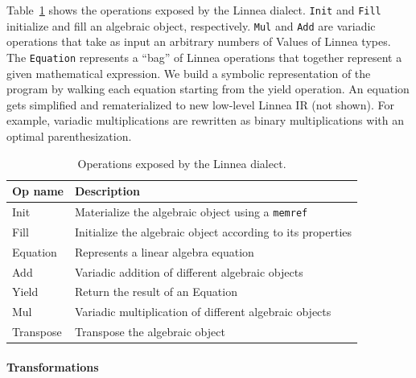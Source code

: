 \documentclass[conference]{IEEEtran}
\begin{document}
Table~\ref{table:operations} shows the operations exposed by the Linnea
dialect. \texttt{Init} and \texttt{Fill} initialize and
fill an algebraic object, respectively. \texttt{Mul} and \texttt{Add} are
variadic operations that take as input an arbitrary numbers of Values of
Linnea types.  The \texttt{Equation} represents a ``bag'' of Linnea operations
that together represent a given mathematical expression. We build a symbolic
representation of the program by walking each equation starting from the yield
operation. An equation gets simplified and rematerialized to new low-level
Linnea IR (not shown).  For example, variadic multiplications are  rewritten as binary
multiplications with an optimal parenthesization. 

\begin{table}
\begin{center}
\begin{tabular}{ll}
    \toprule
    \footnotesize{Op name}     & \footnotesize{Description} \\ \midrule
    \footnotesize{Init} & \footnotesize{Materialize the algebraic object using a \texttt{memref}} \\
    \rowcolor{aluminium1}
    \footnotesize{Fill} & \footnotesize{Initialize the algebraic object according to its properties}  \\
    \footnotesize{Equation} & \footnotesize{Represents a linear algebra equation} \\
    \rowcolor{aluminium1}
    \footnotesize{Add} & \footnotesize{Variadic addition of different algebraic objects} \\ 
    \footnotesize{Yield} & \footnotesize{Return the result of an Equation} \\
    \rowcolor{aluminium1}
    \footnotesize{Mul} & \footnotesize{Variadic multiplication of different algebraic objects} \\ 
    \footnotesize{Transpose} & \footnotesize {Transpose the algebraic object} \\ \bottomrule
\end{tabular}
\end{center}
\caption{Operations exposed by the Linnea dialect.}
\label{table:operations}
\end{table} 

\paragraph{Transformations}
\end{document}
